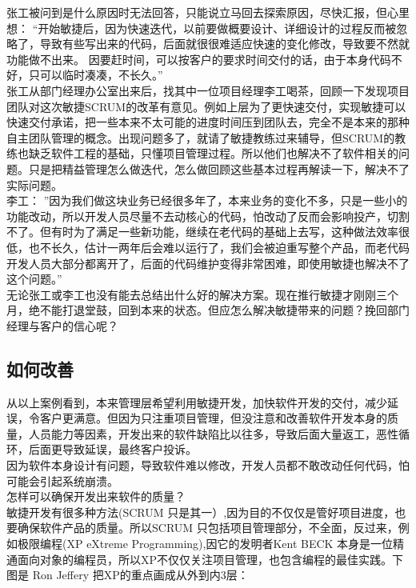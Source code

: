 \documentclass{book}        %
\begin{document}
张工被问到是什么原因时无法回答，只能说立马回去探索原因，尽快汇报，但心里想： “开始敏捷后，因为快速迭代，以前要做概要设计、详细设计的过程反而被忽略了，导致有些写出来的代码，后面就很很难适应快速的变化修改，导致要不然就功能做不出来。 因要赶时间，可以按客户的要求时间交付的话，由于本身代码不好，只可以临时凑凑，不长久。”\\
张工从部门经理办公室出来后，找其中一位项目经理李工喝茶，回顾一下发现项目团队对这次敏捷SCRUM的改革有意见。例如上层为了更快速交付，实现敏捷可以快速交付承诺，把一些本来不太可能的进度时间压到团队去，完全不是本来的那种自主团队管理的概念。出现问题多了，就请了敏捷教练过来辅导，但SCRUM的教练也缺乏软件工程的基础，只懂项目管理过程。所以他们也解决不了软件相关的问题。只是把精益管理怎么做迭代，怎么做回顾这些基本过程再解读一下，解决不了实际问题。\\

李工：
”因为我们做这块业务已经很多年了，本来业务的变化不多，只是一些小的功能改动，所以开发人员尽量不去动核心的代码，怕改动了反而会影响投产，切割不了。但有时为了满足一些新功能，继续在老代码的基础上去写，这种做法效率很低，也不长久，估计一两年后会难以运行了，我们会被迫重写整个产品，而老代码开发人员大部分都离开了，后面的代码维护变得非常困难，即使用敏捷也解决不了这个问题。”\\

无论张工或李工也没有能去总结出什么好的解决方案。现在推行敏捷才刚刚三个月，绝不能打退堂鼓，回到本来的状态。但应怎么解决敏捷带来的问题？挽回部门经理与客户的信心呢？\\
\hypertarget{ux5982ux4f55ux6539ux5584}{%
\subsection{如何改善}\label{ux5982ux4f55ux6539ux5584}}

从以上案例看到，本来管理层希望利用敏捷开发，加快软件开发的交付，减少延误，令客户更满意。但因为只注重项目管理，但没注意和改善软件开发本身的质量，人员能力等因素，开发出来的软件缺陷比以往多，导致后面大量返工，恶性循环，后面更导致延误，最终客户投诉。\\
因为软件本身设计有问题，导致软件难以修改，开发人员都不敢改动任何代码，怕可能会引起系统崩溃。\\

怎样可以确保开发出来软件的质量？\\

敏捷开发有很多种方法(SCRUM 只是其一）,因为目的不仅仅是管好项目进度，也要确保软件产品的质量。所以SCRUM 只包括项目管理部分，不全面，反过来，例如极限编程(XP eXtreme Programming),因它的发明者Kent BECK 本身是一位精通面向对象的编程员，所以XP不仅仅关注项目管理，也包含编程的最佳实践。下图是 Ron Jeffery 把XP的重点画成从外到内3层： \\
\end{document}
